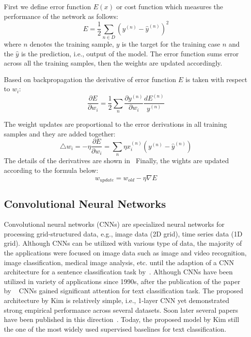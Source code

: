 First we define error function $E(x)$ or cost function which measures the performance of the network as follows:%
\begin{equation}
    E= \frac{1}{2}\sum_{n\in D} (y^{(n)}-\hat{y}^{(n)})^2
\end{equation}
where $n$ denotes the training sample, $y$ is the target for the training case $n$ and the $\hat{y}$ is the prediction, i.e., output of the model. The error function sums error across all the training samples, then the weights are updated accordingly. 

Based on backpropagation the derivative of error function $E$ is taken with respect to $w_i$:
\begin{equation}
    \frac{\partial E}{\partial w_i}=\frac{1}{2}\sum_{n} \frac{\partial y^{(n)}}{\partial w_i} \frac{dE^{(n)}}{y^{(n)}}
\end{equation}

The weight updates are proportional to the error derivations in all training samples and they are added together:
\begin{equation}
    \triangle w_i = - \eta \frac{\partial E}{\partial w_i} = \sum_{n} \eta x_i^{(n)} (y^{(n)} - \hat{y}^{(n)})
\end{equation}
The details of the derivatives are shown in~\cite{}
Finally, the wights are updated according to the formula below:
\begin{equation}
   w_{update}= w_{old}-\eta \nabla E
\end{equation}
    
\subsection{Convolutional Neural Networks}
\label{subsec:CNNs}
Convolutional neural networks (CNNs) are specialized neural networks for processing grid-structured data, e.g., image data (2D grid), time series data (1D grid). Although CNNs can be utilized with various type of data, the majority of the applications were focused on image data such as image and video recognition, image classification, medical image analysis, etc. until the adaption of a CNN architecture for a sentence classification task by~\cite{DBLP:conf/emnlp/Kim14}. %
Although CNNs have been utilized in variety of applications since 1990s, after the publication of the paper by ~\cite{DBLP:conf/emnlp/Kim14} CNNs gained significant attention for text classification task. The proposed architecture by Kim is relatively simple, i.e., 1-layer CNN yet demonstrated strong empirical performance across several datasets. Soon later several papers have been published in this direction~\cite{}.
Today, the proposed model by Kim still the one of the most widely used supervised baselines for text classification. 

